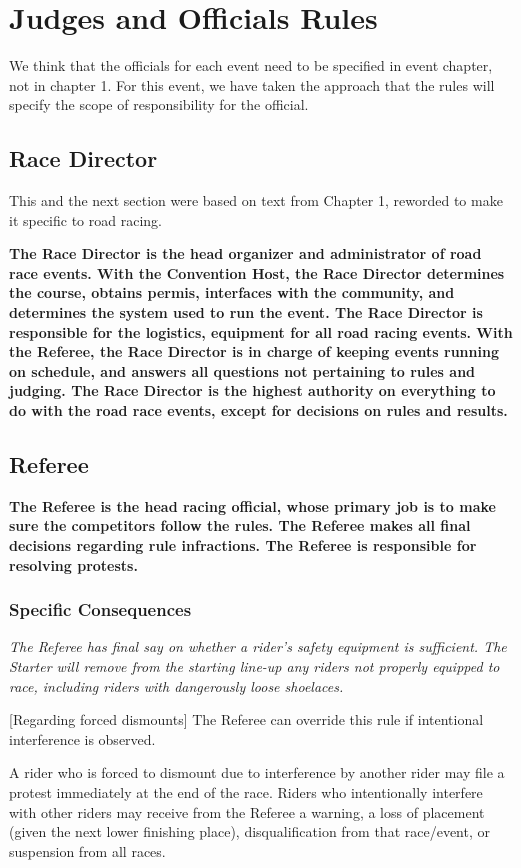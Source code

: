 \chapter{Judges and Officials Rules}

\begin{framed}
We think that the officials for each event need to be specified in event chapter, not in chapter 1. For this event, we have taken the approach that the rules will specify the scope of responsibility for the official.
\end{framed}

\section{Race Director}

\begin{framed}
This and the next section were based on text from Chapter 1, reworded to make it specific to road racing.
\end{framed}

\textbf{The Race Director is the head organizer and administrator of road race
events.  With the Convention Host, the Race Director determines the course,
obtains permis, interfaces with the community, and determines the system
used to run the event.  The Race Director is responsible for the logistics,
equipment for all road racing events.  With the Referee, the
Race Director is in charge of keeping events running on schedule, and
answers all questions not pertaining to rules and judging.  The Race
Director is the highest authority on everything to do with the road race
events, except for decisions on rules and results.}

\section{Referee}

\textbf{The Referee is the head racing official, whose primary job is to make sure
the competitors follow the rules.  The Referee makes all final decisions
regarding rule infractions. The Referee is responsible for resolving
protests.}

\subsection{Specific Consequences}

\textit{The Referee has final say on whether a rider's safety equipment is sufficient. 
The Starter will remove from the starting line-up any riders not properly equipped to race, including riders with dangerously loose shoelaces.}

[Regarding forced dismounts] The Referee can override this rule if intentional interference is observed.

A rider who is forced to dismount due to interference by another rider may file a protest immediately at the end of the race.
Riders who intentionally interfere with other riders may receive from the Referee a warning, a loss of placement (given the next lower finishing place), disqualification from that race/event, or suspension from all races.
